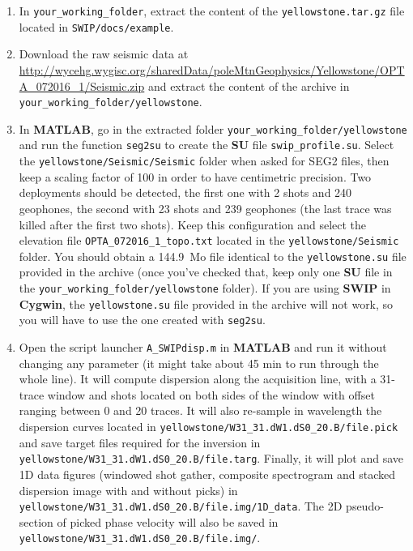 \documentclass[twoside,a4paper]{article}
\def\SWIP{\textbf{SWIP}}
\def\SU{\textbf{SU}}
\def\MATLAB{\textbf{MATLAB}}
\def\Cygwin{\textbf{Cygwin}}
\begin{document}
\begin{enumerate}[leftmargin=*]
\setlength\itemsep{2ex}
\item In \verb|your_working_folder|, extract the content of the \verb|yellowstone.tar.gz| file located in \verb|SWIP/docs/example|.

\item Download the raw seismic data at \url{http://wycehg.wygisc.org/sharedData/poleMtnGeophysics/Yellowstone/OPTA_072016_1/Seismic.zip} and extract the content of the archive in \verb|your_working_folder/yellowstone|.

\item In {\MATLAB}, go in the extracted folder \verb|your_working_folder/yellowstone| and run the function \verb|seg2su| to create the {\SU} file \verb|swip_profile.su|. Select the \verb|yellowstone/Seismic/Seismic| folder when asked for SEG2 files, then keep a scaling factor of 100 in order to have centimetric precision. Two deployments should be detected, the first one with 2 shots and 240 geophones, the second with 23 shots and 239 geophones (the last trace was killed after the first two shots). Keep this configuration and select the elevation file \verb|OPTA_072016_1_topo.txt| located in the \verb|yellowstone/Seismic| folder. You should obtain a 144.9~Mo file identical to the \verb|yellowstone.su| file provided in the archive (once you've checked that, keep only one {\SU} file in the \verb|your_working_folder/yellowstone| folder). If you are using {\SWIP} in {\Cygwin}, the \verb|yellowstone.su| file provided in the archive will not work, so you will have to use the one created with \verb|seg2su|.

\item Open the script launcher \verb|A_SWIPdisp.m| in {\MATLAB} and run it without changing any parameter (it might take about 45 min to run through the whole line). It will compute dispersion along the acquisition line, with a 31-trace window and shots located on both sides of the window with offset ranging between 0 and 20 traces. It will also re-sample in wavelength the dispersion curves located in \verb|yellowstone/W31_31.dW1.dS0_20.B/file.pick| and save target files required for the inversion in \verb|yellowstone/W31_31.dW1.dS0_20.B/file.targ|. Finally, it will plot and save 1D data figures (windowed shot gather, composite spectrogram and stacked dispersion image with and without picks) in \verb|yellowstone/W31_31.dW1.dS0_20.B/file.img/1D_data|. The 2D pseudo-section of picked phase velocity will also be saved in \verb|yellowstone/W31_31.dW1.dS0_20.B/file.img/|.


\end{enumerate}
\end{document}
